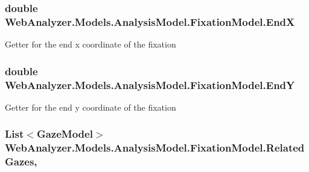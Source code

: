 \subsubsection[{End\+X}]{\setlength{\rightskip}{0pt plus 5cm}double Web\+Analyzer.\+Models.\+Analysis\+Model.\+Fixation\+Model.\+End\+X\hspace{0.3cm}{\ttfamily [get]}}\label{class_web_analyzer_1_1_models_1_1_analysis_model_1_1_fixation_model_a0b77bda45070dad7347eaa90daf29247}


Getter for the end x coordinate of the fixation 

\hypertarget{class_web_analyzer_1_1_models_1_1_analysis_model_1_1_fixation_model_a431705c50a74006b786fbcf7e357567f}{}
\subsubsection[{End\+Y}]{\setlength{\rightskip}{0pt plus 5cm}double Web\+Analyzer.\+Models.\+Analysis\+Model.\+Fixation\+Model.\+End\+Y\hspace{0.3cm}{\ttfamily [get]}}\label{class_web_analyzer_1_1_models_1_1_analysis_model_1_1_fixation_model_a431705c50a74006b786fbcf7e357567f}


Getter for the end y coordinate of the fixation 

\hypertarget{class_web_analyzer_1_1_models_1_1_analysis_model_1_1_fixation_model_a478001ceab5fb747d7d33cbd81382932}{}
\subsubsection[{Related\+Gazes}]{\setlength{\rightskip}{0pt plus 5cm}List$<${\bf Gaze\+Model}$>$ Web\+Analyzer.\+Models.\+Analysis\+Model.\+Fixation\+Model.\+Related\+Gazes\hspace{0.3cm}{\ttfamily [get]}, {\ttfamily [set]}}\label{class_web_analyzer_1_1_models_1_1_analysis_model_1_1_fixation_model_a478001ceab5fb747d7d33cbd81382932}


